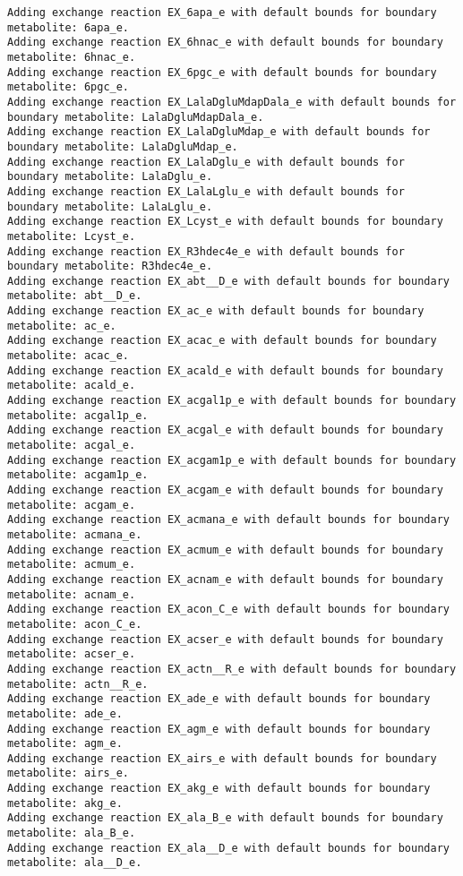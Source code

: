 \documentclass[
  letterpaper,
  DIV=11,
  numbers=noendperiod]{scrartcl}
\begin{document}
\begin{verbatim}
Adding exchange reaction EX_6apa_e with default bounds for boundary metabolite: 6apa_e.
Adding exchange reaction EX_6hnac_e with default bounds for boundary metabolite: 6hnac_e.
Adding exchange reaction EX_6pgc_e with default bounds for boundary metabolite: 6pgc_e.
Adding exchange reaction EX_LalaDgluMdapDala_e with default bounds for boundary metabolite: LalaDgluMdapDala_e.
Adding exchange reaction EX_LalaDgluMdap_e with default bounds for boundary metabolite: LalaDgluMdap_e.
Adding exchange reaction EX_LalaDglu_e with default bounds for boundary metabolite: LalaDglu_e.
Adding exchange reaction EX_LalaLglu_e with default bounds for boundary metabolite: LalaLglu_e.
Adding exchange reaction EX_Lcyst_e with default bounds for boundary metabolite: Lcyst_e.
Adding exchange reaction EX_R3hdec4e_e with default bounds for boundary metabolite: R3hdec4e_e.
Adding exchange reaction EX_abt__D_e with default bounds for boundary metabolite: abt__D_e.
Adding exchange reaction EX_ac_e with default bounds for boundary metabolite: ac_e.
Adding exchange reaction EX_acac_e with default bounds for boundary metabolite: acac_e.
Adding exchange reaction EX_acald_e with default bounds for boundary metabolite: acald_e.
Adding exchange reaction EX_acgal1p_e with default bounds for boundary metabolite: acgal1p_e.
Adding exchange reaction EX_acgal_e with default bounds for boundary metabolite: acgal_e.
Adding exchange reaction EX_acgam1p_e with default bounds for boundary metabolite: acgam1p_e.
Adding exchange reaction EX_acgam_e with default bounds for boundary metabolite: acgam_e.
Adding exchange reaction EX_acmana_e with default bounds for boundary metabolite: acmana_e.
Adding exchange reaction EX_acmum_e with default bounds for boundary metabolite: acmum_e.
Adding exchange reaction EX_acnam_e with default bounds for boundary metabolite: acnam_e.
Adding exchange reaction EX_acon_C_e with default bounds for boundary metabolite: acon_C_e.
Adding exchange reaction EX_acser_e with default bounds for boundary metabolite: acser_e.
Adding exchange reaction EX_actn__R_e with default bounds for boundary metabolite: actn__R_e.
Adding exchange reaction EX_ade_e with default bounds for boundary metabolite: ade_e.
Adding exchange reaction EX_agm_e with default bounds for boundary metabolite: agm_e.
Adding exchange reaction EX_airs_e with default bounds for boundary metabolite: airs_e.
Adding exchange reaction EX_akg_e with default bounds for boundary metabolite: akg_e.
Adding exchange reaction EX_ala_B_e with default bounds for boundary metabolite: ala_B_e.
Adding exchange reaction EX_ala__D_e with default bounds for boundary metabolite: ala__D_e.

\end{verbatim}
\end{document}
